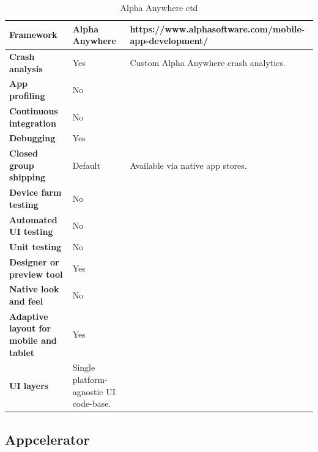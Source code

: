 \documentclass[english,master,public,dept460,male,cpdeclaration,oneside]{diploma}
\begin{document}
\begin{table}[!h]
	\centering
	\caption{Alpha Anywhere ctd}
	\begin{tabular}{p{} | p{} | p{}}
		\toprule		
		\textbf{Framework} & \textbf{Alpha Anywhere} & https://www.alphasoftware.com/mobile-app-development/ \\
		\midrule
		\textbf{Crash analysis} & Yes & Custom Alpha Anywhere crash analytics. \\			
		\midrule
		\textbf{App profiling} & No & \\			
		\midrule
		\textbf{Continuous integration} & No & \\			
		\midrule
		\textbf{Debugging} & Yes & \\			
		\midrule
		\textbf{Closed group shipping} & Default & Available via native app stores. \\			
		\midrule
		\textbf{Device farm testing} & No & \\			
		\midrule
		\textbf{Automated UI testing} & No & \\			
		\midrule
		\textbf{Unit testing} & No & \\			
		\midrule
		\textbf{Designer or preview tool} & Yes & \\			
		\midrule
		\textbf{Native look and feel} & No & \\			
		\midrule
		\textbf{Adaptive layout for mobile and tablet} & Yes & \\			
		\midrule		
		\textbf{UI layers} & Single platform-agnostic UI code-base. &  \\			
		\midrule
	\end{tabular}
\end{table}

\clearpage
\subsection{Appcelerator}
\end{document}
